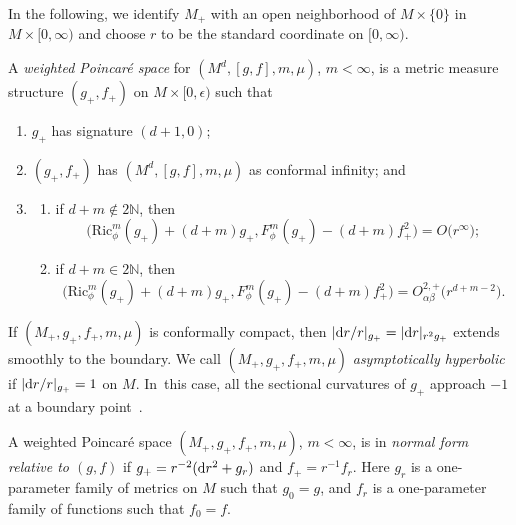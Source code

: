 \documentclass[pdftex]{sigma}
\newcommand{\psmms}{(M_+,g_+,f_+,m,\mu)}
\numberwithin{equation}{section}
\begin{document}
In the following, we identify $M_+$ with an open neighborhood of $M\times \{0\}$ in $M\times [0,\infty)$ and choose $r$ to be the standard coordinate on $[0,\infty)$.

\begin{Definition}
\label{poincare-definition}
A \emph{weighted Poincar\'e space} for $(M^d,[g,f],m,\mu)$, $m<\infty$, is a metric measure structure $(g_+,f_+)$ on $M\times [0,\epsilon)$ such that
\begin{enumerate}[label=$(\roman*)$]\itemsep=0pt

\item $g_+$ has signature $(d+1,0)$;

\item $(g_+,f_+)$ has $(M^d,[g,f],m,\mu)$ as conformal infinity; and

\item \begin{enumerate}\itemsep=0pt
\item[$(a)$] if $d+m\notin 2\mathbb{N}$, then
\begin{equation*}
\big(\mathrm{Ric}_{\phi}^m(g_+)+(d+m)g_+,F_\phi^m(g_+)
-(d+m)f_+^2\big)=O\big(r^\infty\big);
\end{equation*}

\item[$(b)$] if $d+m\in 2\mathbb{N}$, then
\begin{equation*}
\big(\mathrm{Ric}_{\phi}^m(g_+)+(d+m)g_+,F_\phi^m(g_+)
-(d+m)f_+^2\big)=O^{2,+}_{\alpha\beta}\big(r^{d+m-2}\big).
\end{equation*}
\end{enumerate}
\end{enumerate}
\end{Definition}


If $\psmms$ is conformally compact, then $|{\rm d}r/r|_{g_+}=|{\rm d}r|_{r^2 g_+}$ extends smoothly to the boundary. We call $\psmms$ \emph{asymptotically hyperbolic} if $|{\rm d}r/r|_{g_+}=1$ on $M$. In~this case, all the sectional curvatures of $g_+$ approach $-1$ at a boundary point~\cite{MazzeoMelrose1987}.

\begin{Definition}
A weighted Poincar\'e space $\psmms$, $m<\infty$, is in \emph{normal form relative to $(g,f)$} if $g_+=r^{-2}({\rm d}r^2+g_r)$ and $f_+=r^{-1}f_r$. Here $g_r$ is a one-parameter family of metrics on $M$ such that $g_0=g$, and $f_r$ is a one-parameter family of functions such that $f_0=f$.
\end{Definition}
\end{document}

